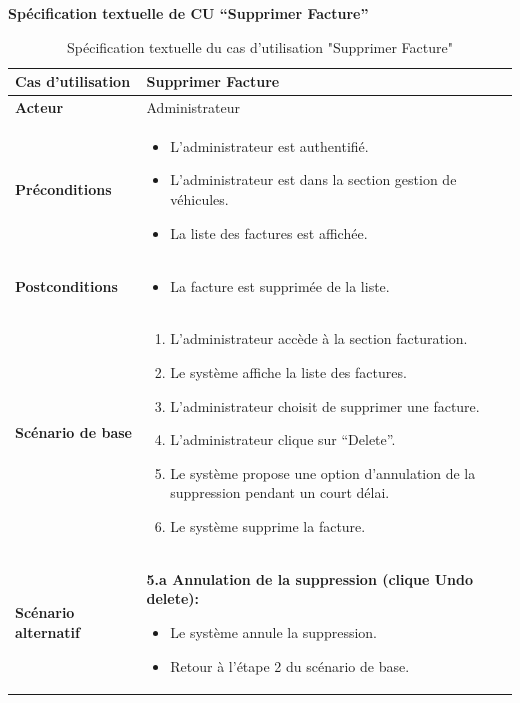\documentclass[a4paper,11pt]{report}
\begin{document}
\newpage
\textbf{Spécification textuelle de CU “Supprimer Facture”}

\begin{table}[H]
  \centering
  \renewcommand{\arraystretch}{1.5}
  \caption{Spécification textuelle du cas d'utilisation "Supprimer Facture"}
  \begin{tabularx}{\textwidth}{|l|X|}
    \hline
    \textbf{Cas d'utilisation} & Supprimer Facture \\ \hline
    \textbf{Acteur}            & Administrateur \\ \hline
    \textbf{Préconditions}     & 
      \begin{itemize}[leftmargin=*]
        \item L’administrateur est authentifié.
        \item L'administrateur est dans la section gestion de véhicules.
        \item La liste des factures est affichée.
      \end{itemize} \\ \hline
    \textbf{Postconditions}    & 
      \begin{itemize}[leftmargin=*]
        \item La facture est supprimée de la liste.
      \end{itemize} \\ \hline
    \textbf{Scénario de base}  & 
      \begin{enumerate}[leftmargin=*]
        \item L’administrateur accède à la section facturation.
        \item Le système affiche la liste des factures.
        \item L'administrateur choisit de supprimer une facture.
        \item L'administrateur clique sur “Delete”.
        \item Le système propose une option d’annulation de la suppression pendant un court délai.
        \item Le système supprime la facture.
      \end{enumerate} \\ \hline
    \textbf{Scénario alternatif} & 
      \textbf{5.a Annulation de la suppression (clique Undo delete):}
      \begin{itemize}[leftmargin=*]
        \item Le système annule la suppression.
        \item Retour à l’étape 2 du scénario de base.
      \end{itemize} \\ \hline
  \end{tabularx}
\end{table}
\end{document}
